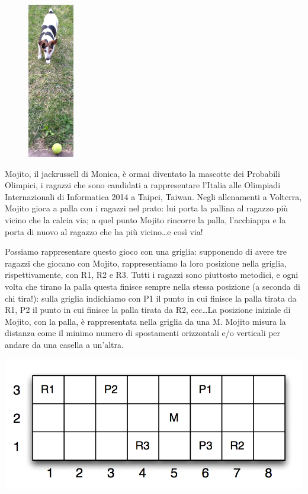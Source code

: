 \renewcommand{\nomebreve}{mojito}
\renewcommand{\titolo}{Giochiamo con Mojito}
\renewcommand{\difficolta}{\normalsize \textsc{[Difficoltà D=2]}}

{ %

\introduzione{}

\begin{figure}
	\begin{center}
		\includegraphics[width=2cm]{image00.jpg}
	\end{center}
\end{figure}

Mojito, il jackrussell di Monica, è ormai diventato la mascotte dei
Probabili Olimpici, i ragazzi che sono candidati a rappresentare
l’Italia alle Olimpiadi Internazionali di Informatica 2014 a Taipei,
Taiwan. Negli allenamenti a Volterra, Mojito gioca a palla con i
ragazzi nel prato: lui porta la pallina al ragazzo più vicino che la
calcia via; a quel punto Mojito rincorre la palla, l’acchiappa e la
porta di nuovo al ragazzo che ha più vicino\dots e così via!

Possiamo rappresentare questo gioco con una griglia: supponendo di
avere tre ragazzi che giocano con Mojito, rappresentiamo la loro
posizione nella griglia, rispettivamente, con R1, R2 e R3. Tutti i
ragazzi sono piuttosto metodici, e ogni volta che tirano la palla
questa finisce sempre nella stessa posizione (a seconda di chi tira!):
sulla griglia indichiamo con P1 il punto in cui finisce la palla
tirata da R1, P2 il punto in cui finisce la palla tirata da R2,
ecc\dots La posizione iniziale di Mojito, con la palla, è
rappresentata nella griglia da una M. Mojito misura la distanza come
il minimo numero di spostamenti orizzontali e/o verticali per andare
da una casella a un’altra.

\begin{center}
\includegraphics{mojito.png}
\end{center}

} %

